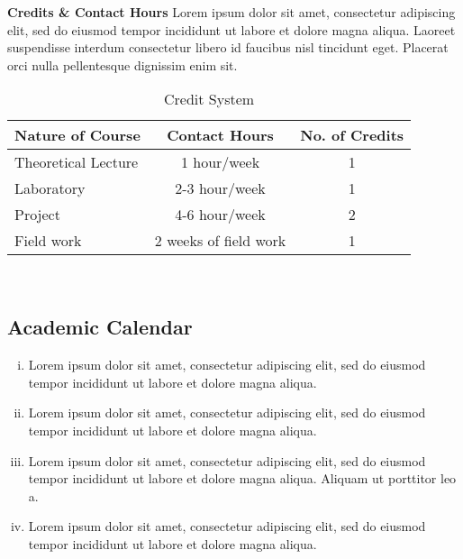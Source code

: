 \documentclass{article}
\begin{document}
\pagebreak

\textbf{Credits \& Contact Hours} Lorem ipsum dolor sit amet, consectetur adipiscing elit, sed do eiusmod tempor incididunt ut labore et dolore magna aliqua. Laoreet suspendisse interdum consectetur libero id faucibus nisl tincidunt eget. Placerat orci nulla pellentesque dignissim enim sit.

\vspace{1cm}

\begin{table}[H]
    \centering
    \begin{tabular}{l|c|c}
        \hline
       Nature of Course  & Contact Hours & No. of Credits \\
       \hline
        Theoretical Lecture & 1 hour/week & 1 \\
        \hline
        Laboratory & 2-3 hour/week & 1\\
        \hline
        Project & 4-6 hour/week & 2\\
        \hline
        Field work & 2 weeks of field work & 1\\
        \hline
    \end{tabular}
    \caption{Credit System}
    \label{tab:my_label}
\end{table}
\\

\subsection{Academic Calendar}
\begin{enumerate}[i.]
    \item Lorem ipsum dolor sit amet, consectetur adipiscing elit, sed do eiusmod tempor incididunt ut labore et dolore magna aliqua.
    \item Lorem ipsum dolor sit amet, consectetur adipiscing elit, sed do eiusmod tempor incididunt ut labore et dolore magna aliqua.
    \item Lorem ipsum dolor sit amet, consectetur adipiscing elit, sed do eiusmod tempor incididunt ut labore et dolore magna aliqua. Aliquam ut porttitor leo a.
    \item Lorem ipsum dolor sit amet, consectetur adipiscing elit, sed do eiusmod tempor incididunt ut labore et dolore magna aliqua.
\end{enumerate}
\end{document}
